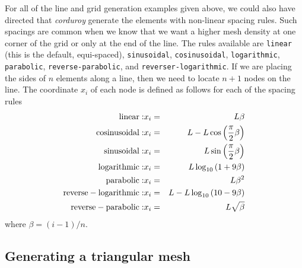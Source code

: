 For all of the line and grid generation examples given above, we
could also have directed that {\em corduroy} generate the elements
with non-linear spacing rules.  Such spacings are common when we
know that we want a higher mesh density at one corner of the grid
or only at the end of the line.  The rules available are 
{\tt linear} (this is the default, equi-spaced), {\tt sinusoidal},
{\tt cosinusoidal}, {\tt logarithmic}, {\tt parabolic}, 
{\tt reverse-parabolic}, and {\tt reverser-logarithmic}.
If we are placing the sides of $n$ elements along a line, then we
need to locate $n + 1$ nodes on the line.  The coordinate $x_i$ of
each node is defined as follows for each of the spacing rules
\begin{eqnarray}
  {\rm linear:}              & x_i = & L \beta \\
  {\rm cosinusoidal:}        & x_i = & L - L\cos\left({\pi \over 2} \beta \right)  \\
  {\rm sinusoidal:}          & x_i = & L \sin\left( {\pi \over 2}  \beta \right)  \\
  {\rm logarithmic:}         & x_i = & L \log_{10} \left( 1 + 9\beta \right) \\
  {\rm parabolic:}           & x_i = & L \beta^2 \\
  {\rm reverse-logarithmic:} & x_i = & L - L \log_{10} \left( 10 - 9\beta \right) \\
  {\rm reverse-parabolic:}   & x_i = & L\sqrt{ \beta } \\
\end{eqnarray}
where $\beta = (i - 1)/n$.  

\subsection{Generating a triangular mesh}

